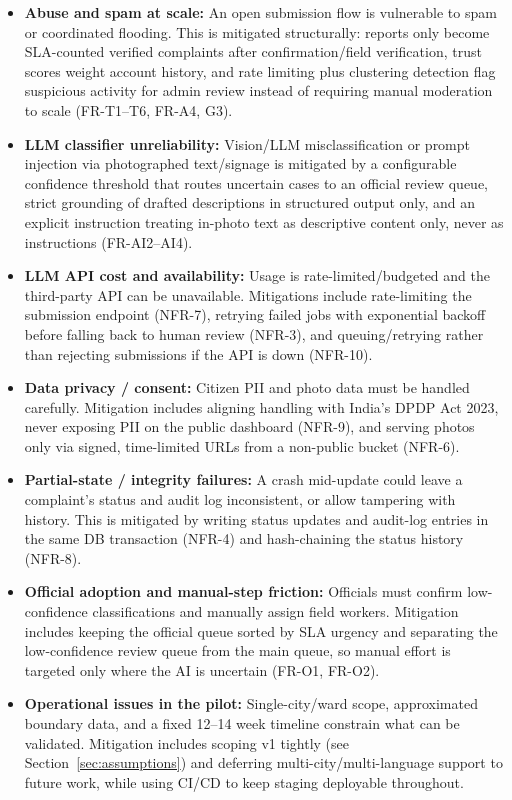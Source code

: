 \documentclass[12pt,a4paper]{article}
\begin{document}
\begin{itemize}
    \item \textbf{Abuse and spam at scale:} An open submission flow is vulnerable to spam or coordinated flooding. This is mitigated structurally: reports only become SLA-counted verified complaints after confirmation/field verification, trust scores weight account history, and rate limiting plus clustering detection flag suspicious activity for admin review instead of requiring manual moderation to scale (FR-T1--T6, FR-A4, G3).

    \item \textbf{LLM classifier unreliability:} Vision/LLM misclassification or prompt injection via photographed text/signage is mitigated by a configurable confidence threshold that routes uncertain cases to an official review queue, strict grounding of drafted descriptions in structured output only, and an explicit instruction treating in-photo text as descriptive content only, never as instructions (FR-AI2--AI4).

    \item \textbf{LLM API cost and availability:} Usage is rate-limited/budgeted and the third-party API can be unavailable. Mitigations include rate-limiting the submission endpoint (NFR-7), retrying failed jobs with exponential backoff before falling back to human review (NFR-3), and queuing/retrying rather than rejecting submissions if the API is down (NFR-10).

    \item \textbf{Data privacy / consent:} Citizen PII and photo data must be handled carefully. Mitigation includes aligning handling with India's DPDP Act 2023, never exposing PII on the public dashboard (NFR-9), and serving photos only via signed, time-limited URLs from a non-public bucket (NFR-6).

    \item \textbf{Partial-state / integrity failures:} A crash mid-update could leave a complaint's status and audit log inconsistent, or allow tampering with history. This is mitigated by writing status updates and audit-log entries in the same DB transaction (NFR-4) and hash-chaining the status history (NFR-8).

    \item \textbf{Official adoption and manual-step friction:} Officials must confirm low-confidence classifications and manually assign field workers. Mitigation includes keeping the official queue sorted by SLA urgency and separating the low-confidence review queue from the main queue, so manual effort is targeted only where the AI is uncertain (FR-O1, FR-O2).

    \item \textbf{Operational issues in the pilot:} Single-city/ward scope, approximated boundary data, and a fixed 12--14 week timeline constrain what can be validated. Mitigation includes scoping v1 tightly (see Section~\ref{sec:assumptions}) and deferring multi-city/multi-language support to future work, while using CI/CD to keep staging deployable throughout.
\end{itemize}
\end{document}

